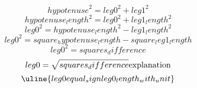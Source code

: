 \[ {hypotenuse}^{2}={leg0}^{2}+{leg1}^{2} \]
\[ {hypotenuse_length}^{2}={leg0}^{2}+{leg1_length}^{2} \]
\[ {leg0}^{2}={hypotenuse_length}^{2}-{leg1_length}^{2} \]
\[ {leg0}^{2}={square_hypotenuse_length}-{square_leg1_length} \]
\[ {leg0}^{2}={squares_difference} \]
\[ {leg0}=\sqrt{\mathstrut {squares_difference}}\text{{explanation}}\]
\[ \uline{{leg0}{equal_sign}{leg0_length_with_unit}}\]